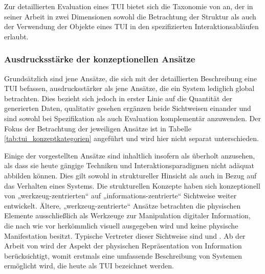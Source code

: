 Zur detaillierten Evaluation eines \gls{TUI} bietet sich die Taxonomie von \citet{Fishkin04} an, der in seiner Arbeit in zwei Dimensionen sowohl die Betrachtung der Struktur als auch der Verwendung der Objekte eines \gls{TUI} in den spezifizierten Interaktionsabläufen erlaubt.

\subsubsection{Ausdrucksstärke der konzeptionellen Ansätze} %
\label{ssub:ausdrucksstärke_der_konzeptionellen_ansätze}

Grundsätzlich sind jene Ansätze, die sich mit der detaillierten Beschreibung eine \gls{TUI} befassen, ausdrucksstärker als jene Ansätze, die ein System lediglich global betrachten. Dies bezieht sich jedoch in erster Linie auf die Quantität der generierten Daten, qualitativ gesehen ergänzen beide Sichtweisen einander und sind sowohl bei Spezifikation als auch Evaluation komplementär anzuwenden. Der Fokus der Betrachtung der jeweiligen Ansätze ist in Tabelle \ref{tab:tui_konzeptkategorien} angeführt und wird hier nicht separat unterschieden.

Einige der vorgestellten Ansätze sind inhaltlich insofern als überholt anzusehen, als dass sie heute gängige Techniken und Interaktionsparadigmen nicht adäquat abbilden können. Dies gilt sowohl in struktureller Hinsicht als auch in Bezug auf das Verhalten eines Systems. Die strukturellen Konzepte haben sich konzeptionell von „werkzeug-zentrierten“ auf „informations-zentrierte“ Sichtweise weiter entwickelt. Ältere, „werkzeug-zentrierte“ Ansätze betrachten die physischen Elemente ausschließlich als Werkzeuge zur Manipulation digitaler Information, die nach wie vor herkömmlich visuell ausgegeben wird und keine physische Manifestation besitzt. Typische Vertreter dieser Sichtweise sind \citep{Fitzmaurice95} und \citep{Fitzmaurice96}. Ab der Arbeit von \citet{Ishii97} wird der Aspekt der physischen Repräsentation von Information berücksichtigt, womit erstmals eine umfassende Beschreibung von Systemen ermöglicht wird, die heute als \gls{TUI} bezeichnet werden.

